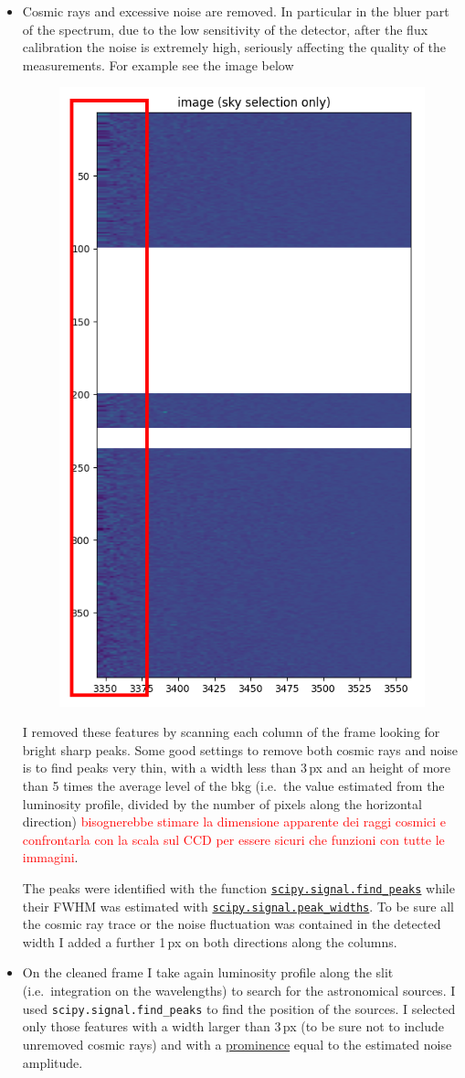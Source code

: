 \documentclass{article}
\begin{document}
\begin{itemize}
	\item Cosmic rays and excessive noise are removed. In particular in the bluer part of the spectrum, due to the low sensitivity of the detector, after the flux calibration the noise is extremely high, seriously affecting the quality of the measurements. For example see the image below
	\begin{figure}[h!]
		\centering
		\includegraphics[width=.35\textwidth, angle=90]{10_det}
	\end{figure}
	I removed these features by scanning each column of the frame looking for bright sharp peaks. Some good settings to remove both cosmic rays and noise is to find peaks very thin, with a width less than 3\,px and an height of more than 5 times the average level of the bkg (i.e.\ the value estimated from the luminosity profile, divided by the number of pixels along the horizontal direction) \textcolor{red}{bisognerebbe stimare la dimensione apparente dei raggi cosmici e confrontarla con la scala sul CCD per essere sicuri che funzioni con tutte le immagini}.
	
	The peaks were identified with the function \href{https://docs.scipy.org/doc/scipy/reference/generated/scipy.signal.find_peaks.html}{\texttt{scipy.signal.find\_peaks}} while their FWHM was estimated with \href{https://docs.scipy.org/doc/scipy/reference/generated/scipy.signal.peak_widths.html#scipy.signal.peak_widths}{\texttt{scipy.signal.peak\_widths}}. To be sure all the cosmic ray trace or the noise fluctuation was contained in the detected width I added a further 1\,px on both directions along the columns.
	
	\item On the cleaned frame I take again luminosity profile along the slit (i.e.\ integration on the wavelengths) to search for the astronomical sources. I used \texttt{scipy.signal.find\_peaks} to find the position of the sources. I selected only those features with a width larger than 3\,px (to be sure not to include unremoved cosmic rays) and with a \href{https://en.wikipedia.org/wiki/Topographic_prominence}{prominence} equal to the estimated noise amplitude.
	

\end{itemize}
\end{document}

